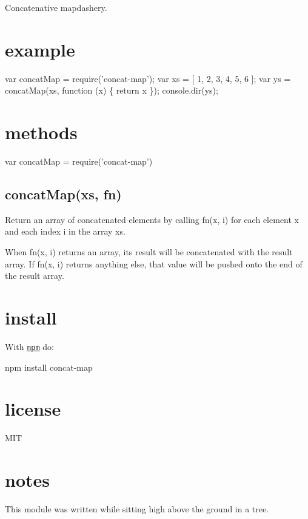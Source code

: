 Concatenative mapdashery.

\href{http://ci.testling.com/substack/node-concat-map}{\tt }

\href{http://travis-ci.org/substack/node-concat-map}{\tt }

\section*{example }


\begin{DoxyCode}
var concatMap = require('concat-map');
var xs = [ 1, 2, 3, 4, 5, 6 ];
var ys = concatMap(xs, function (x) \{
    return x %
\});
console.dir(ys);
\end{DoxyCode}







\begin{DoxyCode}
[ 0.9, 1, 1.1, 2.9, 3, 3.1, 4.9, 5, 5.1 ]
\end{DoxyCode}


\section*{methods }


\begin{DoxyCode}
var concatMap = require('concat-map')
\end{DoxyCode}


\subsection*{concat\+Map(xs, fn) }

Return an array of concatenated elements by calling {\ttfamily fn(x, i)} for each element {\ttfamily x} and each index {\ttfamily i} in the array {\ttfamily xs}.

When {\ttfamily fn(x, i)} returns an array, its result will be concatenated with the result array. If {\ttfamily fn(x, i)} returns anything else, that value will be pushed onto the end of the result array.

\section*{install }

With \href{http://npmjs.org}{\tt npm} do\+:


\begin{DoxyCode}
npm install concat-map
\end{DoxyCode}


\section*{license }

M\+IT

\section*{notes }

This module was written while sitting high above the ground in a tree. 
